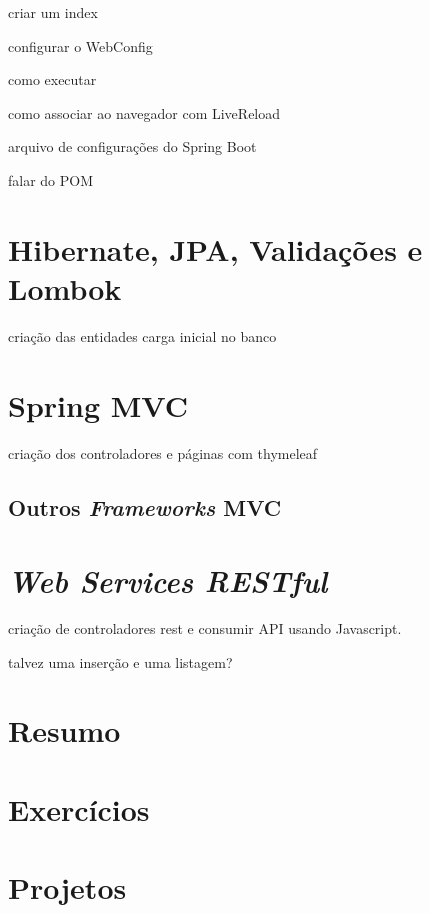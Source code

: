 criar um index

configurar o WebConfig

como executar

como associar ao navegador com LiveReload

arquivo de configurações do Spring Boot

falar do POM


\section{Hibernate, JPA, Validações e Lombok}

criação das entidades
carga inicial no banco


\section{Spring MVC}

criação dos controladores e páginas com thymeleaf


\subsection{Outros \textit{Frameworks} MVC}



\section{\textit{Web Services RESTful}}

criação de controladores rest e consumir API usando Javascript.

talvez uma inserção e uma listagem?


\section{Resumo}

\section{Exercícios}

\section{Projetos}
